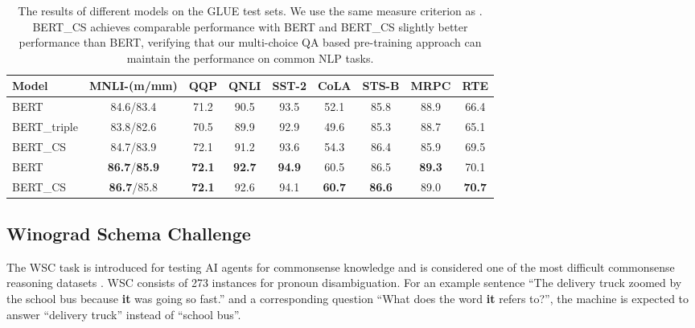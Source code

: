 \documentclass[11pt,a4paper]{article}
\begin{document}
\begin{table*}[t!]
	\begin{center}
		\small
		\begin{tabular}{p{2.2cm}|c|c|c|c|c|c|c|c}
			\toprule
            \textbf{Model}             & \textbf{MNLI-(m/mm)} & \textbf{QQP} & \textbf{QNLI} & \textbf{SST-2} & \textbf{CoLA} & \textbf{STS-B} & \textbf{MRPC} & \textbf{RTE} \\
            \midrule
            BERT     & 84.6/83.4   & 71.2 & 90.5 & 93.5& 52.1 & 85.8 & 88.9 & 66.4  \\
            \midrule
            BERT\_triple     & 83.8/82.6   & 70.5 & 89.9 & 92.9& 49.6 & 85.3 & 88.7 & 65.1  \\
            \midrule
            BERT\_CS  & 84.7/83.9  &  72.1  &91.2 & 93.6& 54.3 & 86.4 & 85.9 & 69.5  \\
            \midrule
            BERT    & \textbf{86.7}/\textbf{85.9} &\textbf{72.1}& \textbf{92.7}& \textbf{94.9} & 60.5 & 86.5 & \textbf{89.3} & 70.1 \\
            \midrule
            BERT\_CS    & \textbf{86.7}/85.8 &\textbf{72.1}& 92.6& 94.1 & \textbf{60.7} & \textbf{86.6} & 89.0 & \textbf{70.7} \\
			\bottomrule
		\end{tabular}
	\end{center}
	\caption{The results of different models on the GLUE test sets. We use the same measure criterion as \citet{devlin-etal-2019-bert}. BERT\_CS achieves comparable performance with BERT and BERT\_CS slightly better performance than BERT, verifying that our multi-choice QA based pre-training approach can maintain the performance on common NLP tasks.}
\label{tab:GLUE_results}
\end{table*}

\subsection{Winograd Schema Challenge}
The WSC task \citep{levesque2012winograd} is introduced for testing AI agents for commonsense knowledge and is considered one of the most difficult commonsense reasoning datasets \citep{zhou2019evaluating}.
WSC consists of 273 instances for pronoun disambiguation. 
For an example sentence ``The delivery truck zoomed by the school bus because \textbf{it} was going so fast.'' and a corresponding question ``What does the word \textbf{it} refers to?'', the machine is expected to answer ``delivery truck'' instead of ``school bus''. 
\end{document}
